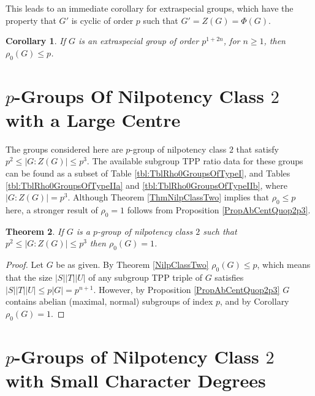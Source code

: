 \documentclass{amsart}
\newtheorem{theorem}{Theorem}[section]
\theoremstyle{observation}
\newtheorem{corollary}[theorem]{Corollary}
\theoremstyle{definition}
\theoremstyle{remark}
\numberwithin{equation}{section}
\begin{document}
This leads to an immediate corollary for extraspecial groups, which have the property that $G'$ is cyclic of order $p$ such that $G' = Z(G) = \Phi(G)$.

\begin{corollary}\label{CorrRho0pGroupCycComm} If $G$ is an extraspecial group of order $p^{1 + 2n}$, for $n \geq 1$, then $\rho_0(G) \leq p$.
\end{corollary}

\section{$p$-Groups Of Nilpotency Class $2$ with a Large Centre}\label{SecGroupsOfTypeIII}

The groups considered here are $p$-group of nilpotency class $2$ that satisfy $p^2 \leq |G:Z(G)| \leq p^3$. The available subgroup TPP ratio data for these groups can be found as a subset of Table \ref{tbl:TblRho0GroupsOfTypeI}, and Tables \ref{tbl:TblRho0GroupsOfTypeIIa} and \ref{tbl:TblRho0GroupsOfTypeIIb}, where $|G:Z(G)| = p^3$. Although Theorem \ref{ThmNilpClassTwo} implies that $\rho_0 \leq p$ here, a stronger result of $\rho_0 = 1$ follows from Proposition \ref{PropAbCentQuop2p3}.

\begin{theorem}\label{ThmRho0pGroupLargeCentre} If $G$ is a $p$-group of nilpotency class $2$ such that $p^2 \leq |G:Z(G)| \leq p^3$ then $\rho_0(G) = 1$.
\end{theorem}
\begin{proof} Let $G$ be as given. By Theorem \ref{NilpClassTwo} $\rho_0(G) \leq p$, which means that the size $|S||T||U|$ of any subgroup TPP triple of $G$ satisfies $|S||T||U| \leq p|G| = p^{n + 1}$. However, by Proposition \ref{PropAbCentQuop2p3} $G$ contains abelian (maximal, normal) subgroups of index $p$, and by Corollary \citep[Corollary 4.3]{Mur} $\rho_0(G) = 1$.
\end{proof}

\section{$p$-Groups of Nilpotency Class $2$ with Small Character Degrees}\label{SecGroupsOfTypeIV}
\end{document}

